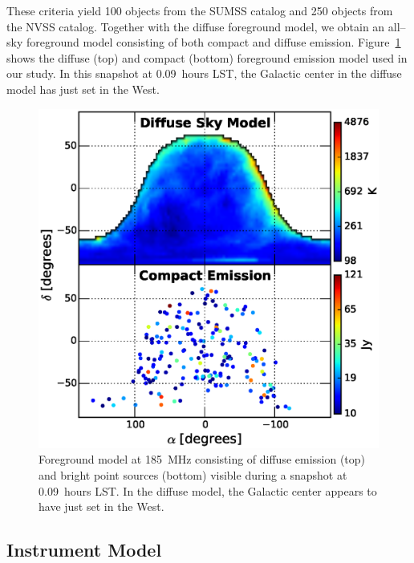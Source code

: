 \documentclass[preprint2,iop,numberedappendix,twocolappendix,appendixfloats]{emulateapj}
\begin{document}
These criteria yield 100 objects from the SUMSS catalog and 250 objects from the NVSS catalog. Together with the diffuse foreground model, we obtain an all--sky foreground model consisting of both compact and diffuse emission. Figure~\ref{fig:sky-model-generic} shows the diffuse (top) and compact (bottom) foreground emission model used in our study. In this snapshot at 0.09~hours LST, the Galactic center in the diffuse model has just set in the West. 

\begin{figure}[htb]
\centering
\includegraphics[width=\linewidth]{figure3.eps}
\caption{Foreground model at 185~MHz consisting of diffuse emission (top) and bright point sources (bottom) visible during a snapshot at 0.09~hours LST. In the diffuse model, the Galactic center appears to have just set in the West. \label{fig:sky-model-generic}}
\end{figure}

\subsection{Instrument Model}\label{sec:instrument_model}
\end{document}
